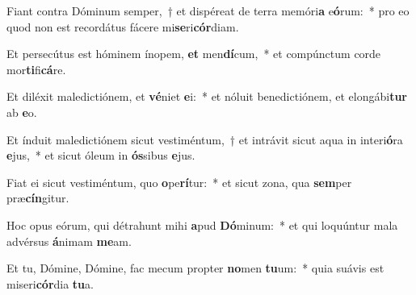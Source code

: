 \item Fiant contra Dóminum semper,~† et dispéreat de terra memóri\textbf{a} e\textbf{ó}rum:~* pro eo quod non est recordátus fácere mi\textbf{se}ri\textbf{cór}diam.
\item Et persecútus est hóminem ínopem, \textbf{et} men\textbf{dí}cum,~* et compúnctum corde mor\textbf{ti}fi\textbf{cá}re.
\item Et diléxit maledictiónem, et \textbf{vé}niet \textbf{e}i:~* et nóluit benedictiónem, et elongábi\textbf{tur} ab \textbf{e}o.
\item Et índuit maledictiónem sicut vestiméntum,~† et intrávit sicut aqua in interi\textbf{ó}ra \textbf{e}jus,~* et sicut óleum in \textbf{ós}sibus \textbf{e}jus.
\item Fiat ei sicut vestiméntum, quo \textbf{o}pe\textbf{rí}tur:~* et sicut zona, qua \textbf{sem}per præ\textbf{cín}gitur.
\item Hoc opus eórum, qui détrahunt mihi \textbf{a}pud \textbf{Dó}minum:~* et qui loquúntur mala advérsus \textbf{á}nimam \textbf{me}am.
\item Et tu, Dómine, Dómine, fac mecum propter \textbf{no}men \textbf{tu}um:~* quia suávis est miseri\textbf{cór}dia \textbf{tu}a.

